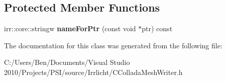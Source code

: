 \subsection*{Protected Member Functions}
\begin{DoxyCompactItemize}
\item 
\hypertarget{classirr_1_1scene_1_1_c_collada_mesh_writer_names_ab933aa5783ecf6602ffaf3b3cdfbf302}{irr\-::core\-::stringw {\bfseries name\-For\-Ptr} (const void $\ast$ptr) const }\label{classirr_1_1scene_1_1_c_collada_mesh_writer_names_ab933aa5783ecf6602ffaf3b3cdfbf302}

\end{DoxyCompactItemize}


The documentation for this class was generated from the following file\-:\begin{DoxyCompactItemize}
\item 
C\-:/\-Users/\-Ben/\-Documents/\-Visual Studio 2010/\-Projects/\-P\-S\-I/source/\-Irrlicht/C\-Collada\-Mesh\-Writer.\-h\end{DoxyCompactItemize}
